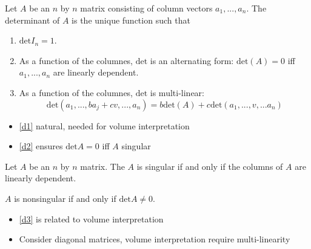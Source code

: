 \documentclass[compress]{beamer}
\renewcommand{\det}{\mathrm{det}}
\begin{document}
\begin{frame}
  \begin{definition}\label{deta}
    Let $A$ be an $n$ by $n$ matrix consisting of column vectors $a_1,
    ..., a_n$. The determinant of $A$ is the unique function such that
    \begin{enumerate}
    \item\label{d1} $\det I_n = 1$.
    \item\label{d2} As a function of the columnes, $\det$ is an
      alternating form: 
      $\det (A) = 0$ iff $a_1, ..., a_n$ are linearly dependent.
    \item\label{d3} As a function of the columnes, $\det$ is multi-linear:
      \[
      \det(a_1, ..., b a_j + c v, ..., a_n) = b\det(A) +
      c\det(a_1,...,v,...a_n) 
      \]
    \end{enumerate}
  \end{definition}
\end{frame}

\begin{frame}
  \begin{itemize}
  \item \ref{d1} natural, needed for volume interpretation
  \item \ref{d2} ensures $\det A = 0$ iff $A$ singular
  \end{itemize}
  \begin{lemma}
    Let $A$ be an $n$ by $n$ matrix. The $A$ is singular if and only if
    the columns of $A$ are linearly dependent.
  \end{lemma}
  \begin{corollary}\label{cor:dns}
    $A$ is nonsingular if and only if $\det A \neq 0$.
  \end{corollary}
\end{frame}

\begin{frame}
  \begin{itemize}
  \item \ref{d3} is related to volume interpretation
  \item Consider diagonal matrices, volume interpretation require
    multi-linearity
  \end{itemize}
\end{frame}
\end{document}

